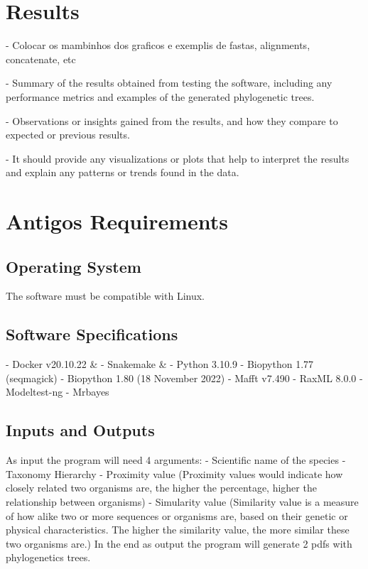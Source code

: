 \documentclass[12pt]{article}
\begin{document}
\section{Results}\label{sec:desenvolvimentos}

- Colocar os mambinhos dos graficos e exemplis de fastas, alignments, concatenate, etc

- Summary of the results obtained from testing the software, including any performance metrics and examples of the generated phylogenetic trees. 

- Observations or insights gained from the results, and how they compare to expected or previous results. 

- It should provide any visualizations or plots that help to interpret the results and explain any patterns or trends found in the data.

\section{Antigos Requirements}\label{sec:desenvolvimentos}
\subsection{Operating System}
The software must be compatible with Linux.
\subsection{Software Specifications}
- Docker v20.10.22 \& \newline
- Snakemake \& \newline
- Python 3.10.9\newline
- Biopython 1.77 (seqmagick)\newline 
- Biopython 1.80 (18 November 2022)\newline
- Mafft v7.490 \newline
- RaxML 8.0.0 \newline
- Modeltest-ng \newline
- Mrbayes\newline
\newpage

\subsection{Inputs and Outputs}
As input the program will need 4 arguments: - Scientific name of the species - Taxonomy Hierarchy - Proximity value (Proximity values would indicate how closely related two organisms are, the higher the percentage, higher the relationship between organisms) - Simularity value (Similarity value is a measure of how alike two or more sequences or organisms are, based on their genetic or physical characteristics. The higher the similarity value, the more similar these two organisms are.)\newline
In the end as output the program will generate 2 pdfs with phylogenetics trees.
    
\end{document}

